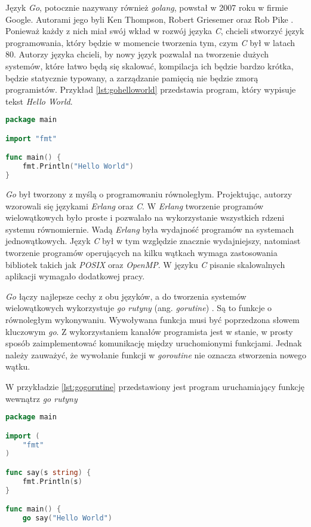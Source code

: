 Język \textsl{Go}, potocznie nazywany również \textsl{golang}, powstał w 2007 roku w firmie Google. Autorami jego byli Ken Thompson, Robert Griesemer oraz Rob Pike \cite{programmingingo}. Ponieważ każdy z nich miał swój wkład w rozwój języka \textsl{C}, chcieli  stworzyć język programowania, który będzie w momencie tworzenia tym, czym \textsl{C} był w latach 80. Autorzy języka chcieli, by nowy język pozwalał na tworzenie dużych systemów, które  łatwo będą się skalować, kompilacja ich będzie bardzo krótka, będzie statycznie typowany, a zarządzanie pamięcią nie będzie zmorą programistów. Przykład \ref{lst:gohelloworld} przedstawia program, który wypisuje tekst \textsl{Hello World}.
\begin{lstlisting}[language=Go, caption={Przykład programu w języku Go}, label={lst:gohelloworld}]
package main

import "fmt"

func main() {
	fmt.Println("Hello World")
}
\end{lstlisting}

\textsl{Go} był tworzony z myślą o programowaniu równoległym. Projektując, autorzy wzorowali się językami \textsl{Erlang} oraz \textsl{C}. W \textsl{Erlang} tworzenie programów wielowątkowych było proste i pozwalało na wykorzystanie wszystkich rdzeni systemu równomiernie. Wadą  \textsl{Erlang} była wydajność programów na systemach jednowątkowych. Język \textsl{C} był w tym względzie znacznie wydajniejszy, natomiast tworzenie programów operujących na kilku wątkach wymaga zastosowania bibliotek takich jak \textsl{POSIX} oraz \textsl{OpenMP}. W języku \textsl{C} pisanie skalowalnych aplikacji wymagało dodatkowej pracy.

\textsl{Go} łączy najlepsze cechy z obu języków, a do tworzenia systemów wielowątkowych wykorzystuje \textsl{go rutyny} (ang. \textsl{gorutine}) \cite{gophrasebook}. Są to funkcje o równoległym wykonywaniu. Wywoływana funkcja musi być poprzedzona słowem kluczowym \textsl{go}. Z wykorzystaniem kanałów programista jest w stanie, w prosty sposób zaimplementować komunikację między uruchomionymi funkcjami. Jednak należy zauważyć, że wywołanie funkcji w \textsl{goroutine} nie oznacza stworzenia nowego wątku. 

W przykładzie \ref{lst:gogorutine} przedstawiony jest program uruchamiający funkcję wewnątrz \textsl{go rutyny}

\begin{lstlisting}[language=Go, caption={Przykładowy program w Go wykorzystujący goroutine}, label={lst:gogorutine}]
package main

import (
	"fmt"
)

func say(s string) {
	fmt.Println(s)
}

func main() {
	go say("Hello World")

\end{lstlisting}



